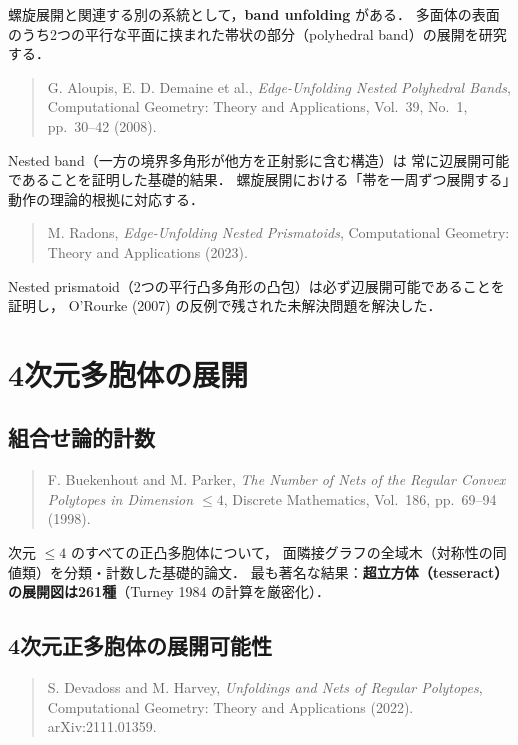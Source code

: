 \documentclass[a4paper,11pt]{article}
\begin{document}
螺旋展開と関連する別の系統として，\textbf{band unfolding} がある．
多面体の表面のうち2つの平行な平面に挟まれた帯状の部分（polyhedral band）の展開を研究する．

\begin{quotation}\noindent
  G. Aloupis, E. D. Demaine et al.,
  \textit{Edge-Unfolding Nested Polyhedral Bands},
  Computational Geometry: Theory and Applications, Vol.~39, No.~1, pp.~30--42 (2008).
\end{quotation}

Nested band（一方の境界多角形が他方を正射影に含む構造）は
常に辺展開可能であることを証明した基礎的結果．
螺旋展開における「帯を一周ずつ展開する」動作の理論的根拠に対応する．

\begin{quotation}\noindent
  M. Radons,
  \textit{Edge-Unfolding Nested Prismatoids},
  Computational Geometry: Theory and Applications (2023).
\end{quotation}

Nested prismatoid（2つの平行凸多角形の凸包）は必ず辺展開可能であることを証明し，
O'Rourke (2007) の反例で残された未解決問題を解決した．

\section{4次元多胞体の展開}

\subsection{組合せ論的計数}

\begin{quotation}\noindent
  F. Buekenhout and M. Parker,
  \textit{The Number of Nets of the Regular Convex Polytopes in Dimension $\leq 4$},
  Discrete Mathematics, Vol.~186, pp.~69--94 (1998).
\end{quotation}

次元 $\leq 4$ のすべての正凸多胞体について，
面隣接グラフの全域木（対称性の同値類）を分類・計数した基礎的論文．
最も著名な結果：\textbf{超立方体（tesseract）の展開図は261種}（Turney 1984 の計算を厳密化）．

\subsection{4次元正多胞体の展開可能性}

\begin{quotation}\noindent
  S. Devadoss and M. Harvey,
  \textit{Unfoldings and Nets of Regular Polytopes},
  Computational Geometry: Theory and Applications (2022).
  arXiv:2111.01359.
\end{quotation}
\end{document}
